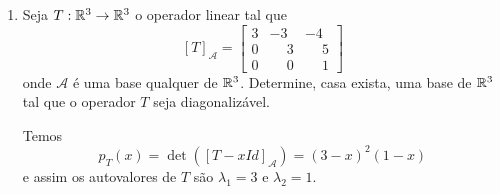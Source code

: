 \begin{exemplo}
\begin{enumerate}
\begin{solucao}
\begin{itemize}
\[				\]
				isto \'e, $x = iy$. Logo
				\[
					\aut_T(i) = \{(iy,y) \in \complex^2 \mid y \in \complex\} = [(i,1)].
				\]
				Assim, $\mathcal{B}_1 = \{(i,1)\}$ \'e uma base de $\aut_T(i)$ e da{\'\i} $\dim_\complex\aut_T(i) = 1$.
				\item Para $\lambda_1 = -i$ temos:
				\[
					[T + iId]_\mathcal{A} = \begin{bmatrix} i & -1\\1 & \phantom{-}i\end{bmatrix}
				\]
				e assim $(x,y) \in \aut_T(-i)$ se, e s\'o se,
				\[
					\begin{bmatrix} i & -1\\1 & \phantom{-}i\end{bmatrix} \begin{bmatrix} x\\y\end{bmatrix}	 = \begin{bmatrix} 0\\0\end{bmatrix},
				\]
				isto \'e, $x = -iy$. Logo
				\[
					\aut_T(-i) = \{(-iy,y) \in \complex^2 \mid y \in \complex\} = [(-i,1)].
				\]
				Assim, $\mathcal{B}_2 = \{(-i,1)\}$ \'e uma base de $\aut_T(-i)$ e da{\'\i} $\dim_\complex\aut_T(-i) = 1$.
			\end{itemize}
			Agora o conjunto $\mathcal{B} = \mathcal{B}_1 \cup \mathcal{B}_2 = \{(i,1);(-i,1)\}$ \'e uma base de $\complex^2$ e nesta base temos
			\[
				[T]_\mathcal{B} = \begin{bmatrix} i & \phantom{-}0\\0 & -i\end{bmatrix}.
			\]
		\end{solucao}
		\item Seja $T : \mathbb{R}^3 \to \mathbb{R}^3$ o operador linear tal que
		\[
			[T]_\mathcal{A} = \begin{bmatrix}
								3 & -3 & -4\\
								0 & \phantom{-}3 & \phantom{-}5\\
								0 & \phantom{-}0 & \phantom{-}1
							\end{bmatrix}
		\]
		onde $\mathcal{A}$ \'e uma base qualquer de $\mathbb{R}^3$. Determine, casa exista, uma base de $\mathbb{R}^3$ tal que o operador $T$ seja diagonaliz\'avel.
		\begin{solucao}
			Temos
			\[
				p_T(x) = \det([T - xId]_\mathcal{A}) = (3 - x)^2(1 - x)
			\]
			e assim os autovalores de $T$ s\~ao $\lambda_1 = 3$ e $\lambda_2 = 1$.
			\begin{itemize}

\end{itemize}
\end{solucao}
\end{enumerate}
\end{exemplo}
